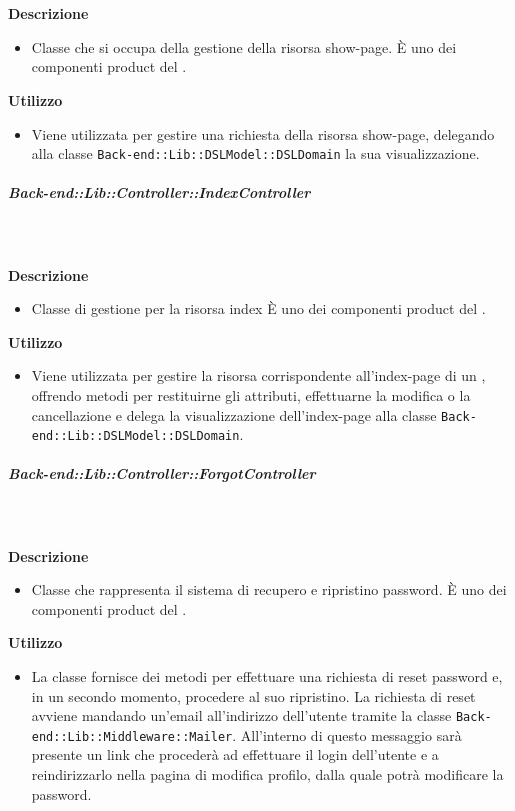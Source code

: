         \textbf{\\ \\ Descrizione} 
          \begin{itemize}
            \item[] Classe che si occupa della gestione della risorsa show-page.
È uno dei componenti product del  .
          \end{itemize}      
        \textbf{Utilizzo}  
          \begin{itemize}
            \item[] Viene utilizzata per gestire una richiesta della risorsa show-page, delegando alla classe \texttt{Back-end::Lib::DSLModel::DSLDomain} la sua visualizzazione.
          \end{itemize}
      \subparagraph{Back-end::Lib::Controller::IndexController}
        
        \textbf{\\ \\ Descrizione} 
          \begin{itemize}
            \item[] Classe di gestione per la risorsa index 
È uno dei componenti product del  .

          \end{itemize}      
        \textbf{Utilizzo}  
          \begin{itemize}
            \item[] Viene utilizzata per gestire la risorsa corrispondente all'index-page di un , offrendo metodi per restituirne gli attributi, effettuarne la modifica o la cancellazione e delega la visualizzazione dell'index-page alla classe \texttt{Back-end::Lib::DSLModel::DSLDomain}.

          \end{itemize}
      \subparagraph{Back-end::Lib::Controller::ForgotController}
        
        \textbf{\\ \\ Descrizione} 
          \begin{itemize}
            \item[] Classe che rappresenta il sistema di recupero e ripristino password. È uno dei componenti product del  .
          \end{itemize}      
        \textbf{Utilizzo}  
          \begin{itemize}
            \item[] La classe fornisce dei metodi per effettuare una richiesta di reset password e, in un secondo momento, procedere al suo ripristino. La richiesta di reset avviene mandando un'email all'indirizzo dell'utente tramite la classe \texttt{Back-end::Lib::Middleware::Mailer}. All'interno di questo messaggio sarà presente un link che procederà ad effettuare il login dell'utente e a reindirizzarlo nella pagina di modifica profilo, dalla quale potrà modificare la password.
          \end{itemize}